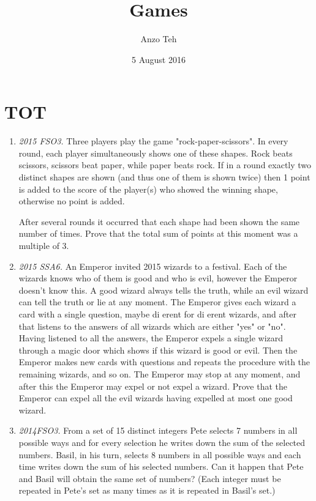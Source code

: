 \documentclass[11pt,a4paper]{article}
\begin{document}
\title{Games}
\author{Anzo Teh}
\date{5 August 2016}
\maketitle
\section {TOT}
\begin{enumerate}
\item\emph {2015 FSO3.} Three players play the game "rock-paper-scissors".  In every round, each player
simultaneously  shows  one  of  these  shapes.   Rock  beats  scissors,  scissors  beat
paper,  while  paper  beats  rock.   If  in  a  round  exactly  two  distinct  shapes  are
shown (and thus one of them is shown twice) then 1 point is added to the score
of the player(s) who showed the winning shape,  otherwise no point is added.

After  several  rounds  it  occurred  that  each  shape  had  been  shown  the  same
number  of  times.   Prove  that  the  total  sum  of  points  at  this  moment  was  a
multiple of 3.

\item\emph {2015 SSA6.} An Emperor invited 2015 wizards to a festival.  Each of the wizards knows who of them is good
and who is evil, however the Emperor doesn't know this.  A good wizard always tells the truth,
while an evil wizard can tell the truth or lie at any moment.  The Emperor gives each wizard a
card with a single question, maybe di erent for di erent wizards, and after that listens to the
answers of all wizards which are either "yes" or "no".  Having listened to all the answers, the
Emperor expels a single wizard through a magic door which shows if this wizard is good or evil.
Then the Emperor makes new cards with questions and repeats the procedure with the remaining
wizards, and so on.  The Emperor may stop at any moment, and after this the Emperor may expel
or not expel a wizard.  Prove that the Emperor can expel all the evil wizards having expelled at
most one good wizard.

\item\emph {2014FSO3.} From a set of 15 distinct integers Pete selects 7 numbers in all possible ways
and for every selection he writes down the sum of the selected numbers.  Basil,
in his turn, selects 8 numbers in all possible ways and each time writes down
the sum of his selected numbers.  Can it happen that Pete and Basil will obtain
the same set of numbers?  (Each integer must be repeated in Pete's set as many
times as it is repeated in Basil's set.)


\end{enumerate}
\end{document}
